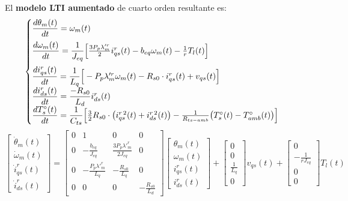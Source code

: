 \documentclass[12pt, a4paper,journal, onecolumn, compsoc]{IEEEtran}
\begin{document}
El \textbf{modelo LTI aumentado} de cuarto orden resultante es:
\begin{equation} \label{eq:sis_escalar_LTI_aug}
\begin{cases}
    \vspace{0.2cm}
    \dfrac{d\theta_m(t)}{dt} = \omega_m(t) \\
    \vspace{0.2cm}
    \dfrac{d\omega_m(t)}{dt} = \dfrac{1}{J_{eq}}\Big[\frac{3 P_p \lambda'^r_m}{2} i_{qs}^r(t) - b_{eq} \omega_m(t) - \frac{1}{r} T_l(t)\Big] \\
    \dfrac{di_{qs}^r(t)}{dt} = \dfrac{1}{L_q}\Big[-P_p \lambda'^r_m \omega_m(t) - R_{s0}\cdot i_{qs}^r(t) + v_{qs}(t)\Big] \\
    \dfrac{di_{ds}^r(t)}{dt} = \dfrac{-R_{s0}}{L_d}i_{ds}^r(t)\\
    \dfrac{dT_s^\circ(t)}{dt} = \dfrac{1}{C_{ts}}\Big[\frac{3}{2}R_{s0}\cdot \big(i_{qs}^{r\,2}(t)+i_{ds}^{r\,2}(t)\big)-\frac{1}{R_{ts-amb}}\big(T_s^\circ(t) - T_{amb}^\circ(t)\big)\Big]
\end{cases}
\end{equation}
\begingroup
\renewcommand{\arraystretch}{1.8} 
\footnotesize\begin{equation}
\begin{bmatrix}
\dot{\theta}_m (t)\\
\dot{\omega}_m(t)\\
\dot{i}_{qs}^r(t)\\
\dot{i}_{ds}^r(t)
\end{bmatrix}
= 
\begin{bmatrix}
0 & 1 & 0 & 0 \\
0  & -\frac{b_{eq}}{J_{eq}} & \frac{3 P_p \lambda'^r_m}{2 J_{eq}} & 0 \\
 0 &  -\frac{P_p \lambda'^r_m}{L_q} & -\frac{R_{s0}}{L_q} & 0 \\
 0 & 0 & 0 & -\frac{R_{s0}}{L_d}
\end{bmatrix}
\begin{bmatrix}
\theta_m(t) \\
\omega_m (t)\\
i_{qs}^r(t) \\
i_{ds}^r(t)
\end{bmatrix}
+
\begin{bmatrix}
0  \\
0  \\
\frac{1}{L_q} \\
0
\end{bmatrix}
v_{qs}(t) 
+
\begin{bmatrix}
0 \\
-\frac{1}{rJ_{eq}} \\
0 \\
0
\end{bmatrix}
T_l(t)
\end{equation}\normalsize
\endgroup
\end{document}
